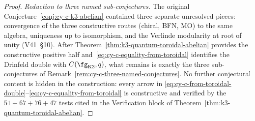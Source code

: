 \begin{proof}
\emph{Reduction to three named sub-conjectures.}  The original
Conjecture~\ref{conj:cy-c-k3-abelian} contained three separate
unresolved pieces: convergence of the three constructive routes
(chiral, BFN, MO) to the same algebra, uniqueness up to isomorphism,
and the Verlinde modularity at root of unity (V41~\S10).  After
Theorem~\ref{thm:k3-quantum-toroidal-abelian} provides the constructive
positive half and~\eqref{eq:cy-c-equality-from-toroidal} identifies
the Drinfeld double with $C(\fg_{\mathrm{K}3}, q)$, what remains is
exactly the three sub-conjectures of
Remark~\ref{rem:cy-c-three-named-conjectures}.  No further conjectural
content is hidden in the construction: every arrow in
\eqref{eq:cy-c-from-toroidal-double}--\eqref{eq:cy-c-equality-from-toroidal}
is constructive and verified by the $51 + 67 + 76 + 47$ tests cited
in the Verification block of Theorem~\ref{thm:k3-quantum-toroidal-abelian}.
\end{proof}


